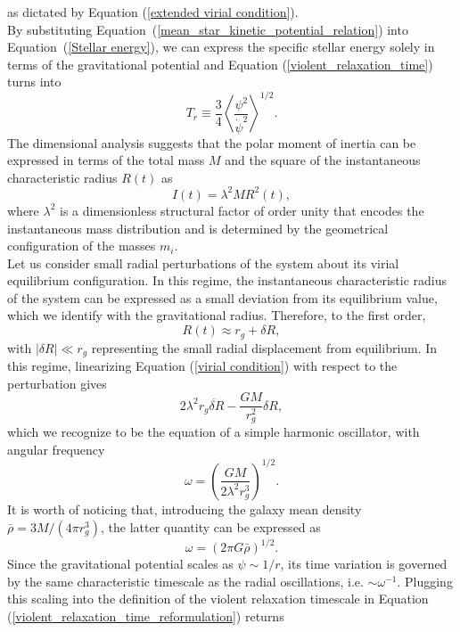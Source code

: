 \documentclass[12pt,twoside,openany]{book}
\begin{document}
as dictated by Equation (\ref{extended virial condition}).\\By substituting Equation~(\ref{mean_star_kinetic_potential_relation}) into Equation~(\ref{Stellar energy}), we can express the specific stellar energy solely in terms of the gravitational potential and Equation (\ref{violent_relaxation_time}) turns into
\begin{equation}
T_r \equiv \frac{3}{4}
\left\langle
\frac{\psi^2}{\dot{\psi}^{2}}
\right\rangle^{1/2}.
\label{violent_relaxation_time_reformulation}
\end{equation}
The dimensional analysis suggests that the polar moment of inertia can be expressed in terms of the total mass $M$ and the square of the instantaneous characteristic radius $R(t)$ as
\begin{equation}
I(t)=\lambda^2 MR^2(t),
\label{moment_of_inertia}
\end{equation}
where $\lambda^2$ is a dimensionless structural factor of order unity that encodes the instantaneous mass distribution and is determined by the geometrical configuration of the masses $m_i$.\\Let us consider small radial perturbations of the system about its virial equilibrium configuration. In this regime, the instantaneous characteristic radius of the system can be expressed as a small deviation from its equilibrium value, which we identify with the gravitational radius. Therefore, to the first order,
\begin{equation}
R(t)\approx r_g+\delta R,
\end{equation}
with $|\delta R|\ll r_g$ representing the small radial displacement from equilibrium. In this regime, linearizing Equation (\ref{virial condition}) with respect to the perturbation gives
\begin{equation}
2\lambda^2r_g\ddot{\delta R}
-\frac{GM}{r_g^2}\delta R,
\end{equation}
which we recognize to be the equation of a simple harmonic oscillator, with angular frequency
\begin{equation}
\omega=\left(
\frac{GM}{2\lambda^2r_g^3}
\right)^{1/2}.
\end{equation}
It is worth of noticing that, introducing the galaxy mean density $\bar{\rho}=3M/(4\pi r_g^3)$, the latter quantity can be expressed as
\begin{equation}
\omega=
\left(
2\pi G\bar{\rho}
\right)^{1/2}.
\end{equation}
Since the gravitational potential scales as $\psi\sim 1/r$, its time variation is governed by the same characteristic timescale as the radial oscillations, i.e. $\sim \omega^{-1}$. Plugging this scaling into the definition of the violent relaxation timescale in Equation (\ref{violent_relaxation_time_reformulation}) returns
\end{document}
